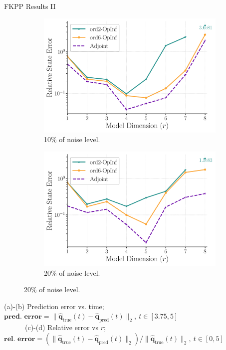 \begin{frame}{FKPP Results II}
\begin{figure}[h!]
  
  \begin{subfigure}[b]{0.3\textwidth}
    \centering
    \includegraphics[width=\linewidth]{images/fkpp_rel_error_vs_r_noise_10.pdf}
    \caption{10\% of noise level.}
    \label{fig:image11}
  \end{subfigure}
  \hspace{1.0cm}
  \begin{subfigure}[b]{0.3\textwidth}
    \centering
    \includegraphics[width=\linewidth]{images/fkpp_rel_error_vs_r_noise_20.pdf}
    \caption{20\% of noise level.}
    \label{fig:image12}
  \end{subfigure}
  
  \label{fig:twobytwo2}
\end{figure}
\begin{center}
    \tiny
    (a)-(b) Prediction error vs. time; $\textbf{pred. error}=\| \hat{\mathbf{q}}_{\text{true}}(t) - \hat{\mathbf{q}}_{\text{pred}}(t) \|_2, ~t\in[3.75,5]$\\~~~~~~(c)-(d) Relative error vs $r$; $\textbf{rel. error}=\left(\| \hat{\mathbf{q}}_{\text{true}}(t) - \hat{\mathbf{q}}_{\text{pred}}(t) \|_2\right)/\| \hat{\mathbf{q}}_{\text{true}}(t) \|_2, ~t\in[0,5]$
\end{center}

\end{frame}